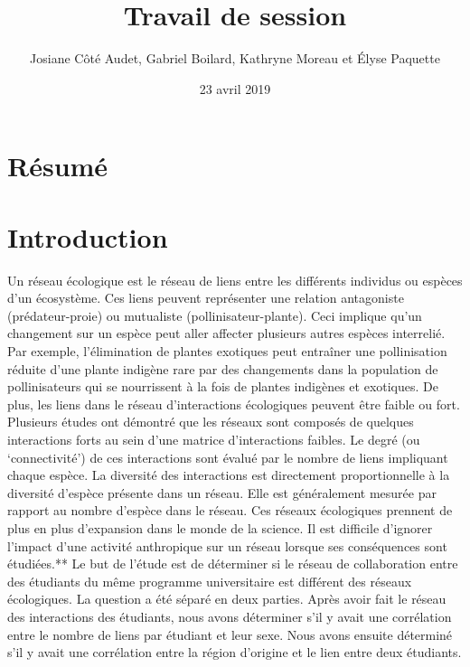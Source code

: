 \documentclass[12pt]{article}
\begin{document}
\title{Travail de session}

\author{Josiane Côté Audet, Gabriel Boilard, Kathryne Moreau et Élyse Paquette}
\date{23 avril 2019}

\maketitle
\section{Résumé}
\section{Introduction}

Un réseau écologique est le réseau de liens entre les différents individus ou espèces d’un écosystème. Ces liens peuvent représenter une relation antagoniste (prédateur-proie) ou mutualiste (pollinisateur-plante). Ceci implique qu’un changement sur un espèce peut aller affecter plusieurs autres espèces interrelié. Par exemple, l'élimination de plantes exotiques peut entraîner une pollinisation réduite d'une plante indigène rare par des changements dans la population de pollinisateurs qui se nourrissent à la fois de plantes indigènes et exotiques.\citep{moore1978interspecific} De plus, les liens dans le réseau d’interactions écologiques peuvent être faible ou fort. Plusieurs études ont démontré que les réseaux sont composés de quelques interactions forts au sein d’une matrice d’interactions faibles. Le degré (ou ‘connectivité’) de ces interactions sont évalué par le nombre de liens impliquant chaque espèce. La diversité des interactions est directement proportionnelle à la diversité d’espèce présente dans un réseau. Elle est généralement mesurée par rapport au nombre d’espèce dans le réseau. Ces réseaux écologiques prennent de plus en plus d’expansion dans le monde de la science. Il est  difficile d’ignorer l’impact d’une activité anthropique sur un  réseau lorsque ses conséquences sont étudiées.** Le but de l’étude est de déterminer si le réseau de collaboration entre des étudiants du même programme universitaire est différent des réseaux écologiques. La question a été séparé en deux parties. Après avoir fait le réseau des interactions des étudiants, nous avons déterminer s’il y avait une corrélation entre le nombre de liens par étudiant et leur sexe. Nous avons ensuite déterminé s’il y avait une corrélation entre la région d’origine et le lien entre deux étudiants.\citep{curry1989geographic}
\end{document}
